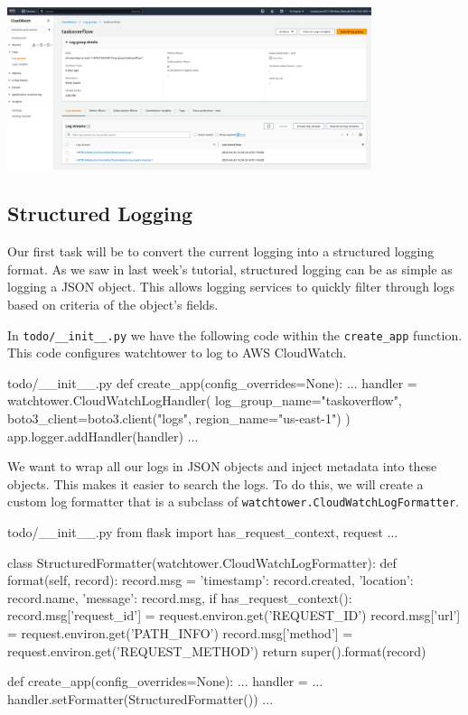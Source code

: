 \documentclass{csse4400}
\begin{document}
\begin{center}
\includegraphics[width=0.8\textwidth]{images/log-group}
\end{center}

\subsection{Structured Logging}

Our first task will be to convert the current logging into a structured logging format.
As we saw in last week's tutorial, structured logging can be as simple as logging a JSON object.
This allows logging services to quickly filter through logs based on criteria of the object's fields.

In \texttt{todo/\_\_init\_\_.py} we have the following code within the \texttt{create\_app} function.
This code configures watchtower to log to AWS CloudWatch.

\begin{code}[language=python,numbers=none]{todo/\_\_init\_\_.py}
def create_app(config_overrides=None): 
    ...
    handler = watchtower.CloudWatchLogHandler(
        log_group_name="taskoverflow",
        boto3_client=boto3.client("logs", region_name="us-east-1")
    )
    app.logger.addHandler(handler)
    ...
\end{code}

We want to wrap all our logs in JSON objects and inject metadata into these objects.
This makes it easier to search the logs.
To do this,
we will create a custom log formatter that is a subclass of \texttt{watchtower.CloudWatchLogFormatter}.

\begin{code}[language=python,numbers=none]{todo/\_\_init\_\_.py}
from flask import has_request_context, request
...

class StructuredFormatter(watchtower.CloudWatchLogFormatter):
    def format(self, record):
        record.msg = {
            'timestamp': record.created,
            'location': record.name,
            'message': record.msg,
        }
        if has_request_context():
            record.msg['request_id'] = request.environ.get('REQUEST_ID')
            record.msg['url'] = request.environ.get('PATH_INFO')
            record.msg['method'] = request.environ.get('REQUEST_METHOD')
        return super().format(record)

def create_app(config_overrides=None): 
    ...
    handler = ...
    handler.setFormatter(StructuredFormatter())
    ...
\end{code}
\end{document}
